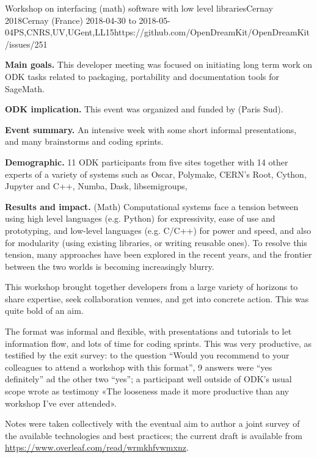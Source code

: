 \begin{event}{Workshop on interfacing (math) software with low level libraries}{Cernay 2018}{Cernay (France) 2018-04-30 to 2018-05-04}{PS,CNRS,UV,UGent,LL}{15}{https://github.com/OpenDreamKit/OpenDreamKit/issues/251}

  \textbf{Main goals.} This developer meeting was focused on
  initiating long term work on ODK tasks related to packaging,
  portability and documentation tools for SageMath.

  \textbf{ODK implication.} This event was organized and funded by
  \ODK (Paris Sud).

  \textbf{Event summary.} An intensive week with some short informal
  presentations, and many brainstorms and coding sprints.

  \textbf{Demographic.} 11 ODK participants from five sites together
  with 14 other experts of a variety of systems such as Oscar,
  Polymake, CERN's Root, Cython, Jupyter and C++, Numba, Dask,
  libsemigroups,

  \textbf{Results and impact.} (Math) Computational systems face a
  tension between using high level languages (e.g. Python) for
  expressivity, ease of use and prototyping, and low-level languages
  (e.g. C/C++) for power and speed, and also for modularity (using
  existing libraries, or writing reusable ones). To resolve this
  tension, many approaches have been explored in the recent years, and
  the frontier between the two worlds is becoming increasingly blurry.

  This workshop brought together developers from a large variety of
  horizons to share expertise, seek collaboration venues, and get into
  concrete action. This was quite bold of an aim.

  The format was informal and flexible, with presentations and
  tutorials to let information flow, and lots of time for coding
  sprints. This was very productive, as testified by the exit survey:
  to the question “Would you recommend to your colleagues to attend a
  workshop with this format”, 9 answers were ``yes definitely'' ad the
  other two ``yes''; a participant well outside of ODK's usual scope
  wrote as testimony «The looseness made it more productive than any
  workshop I've ever attended».

  Notes were taken collectively with the eventual aim to author a
  joint survey of the available technologies and best practices; the
  current draft is available from
  \url{https://www.overleaf.com/read/wrmkhfvwmxnz}.
\end{event}
